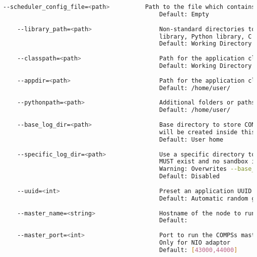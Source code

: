 \begin{lstlisting}[language=bash]
    --scheduler_config_file=<path>          Path to the file which contains the scheduler configuration.
                                            Default: Empty
                                            
    --library_path=<path>                   Non-standard directories to search for libraries (e.g. Java JVM
                                            library, Python library, C binding library)
                                            Default: Working Directory
                                            
    --classpath=<path>                      Path for the application classes / modules
                                            Default: Working Directory
                                            
    --appdir=<path>                         Path for the application class folder.
                                            Default: /home/user/
                                            
    --pythonpath=<path>                     Additional folders or paths to add to the PYTHONPATH
                                            Default: /home/user/
                                            
    --base_log_dir=<path>                   Base directory to store COMPSs log files (a .COMPSs/ folder
                                            will be created inside this location)
                                            Default: User home
                                            
    --specific_log_dir=<path>               Use a specific directory to store COMPSs log files (the folder
                                            MUST exist and no sandbox is created)
                                            Warning: Overwrites --base_log_dir option
                                            Default: Disabled
                                            
    --uuid=<int>                            Preset an application UUID
                                            Default: Automatic random generation
                                            
    --master_name=<string>                  Hostname of the node to run the COMPSs master
                                            Default: 
                                            
    --master_port=<int>                     Port to run the COMPSs master communications.
                                            Only for NIO adaptor
                                            Default: [43000,44000]
                                            

\end{lstlisting}
